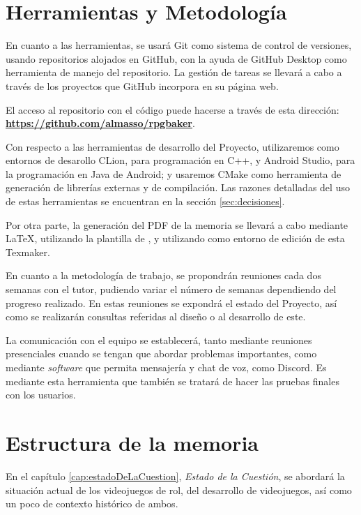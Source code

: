 \section{Herramientas y Metodología}
En cuanto a las herramientas, se usará Git como sistema de control de versiones, usando repositorios alojados en GitHub, con la ayuda de GitHub Desktop como herramienta de manejo del repositorio. La gestión de tareas se llevará a cabo a través de los proyectos que GitHub incorpora en su página web.

\smallskip

El acceso al repositorio con el código puede hacerse a través de esta dirección: \href{https://github.com/almasso/rpgbaker}{\textbf{https://github.com/almasso/rpgbaker}}.

\medskip

Con respecto a las herramientas de desarrollo del Proyecto, utilizaremos como entornos de desarollo CLion, para programación en C++, y Android Studio, para la programación en Java de Android; y usaremos CMake como herramienta de generación de librerías externas y de compilación. Las razones detalladas del uso de estas herramientas se encuentran en la sección \ref{sec:decisiones}.

\medskip

Por otra parte, la generación del PDF de la memoria se llevará a cabo mediante \LaTeX , utilizando la plantilla de \texis , y utilizando como entorno de edición de esta Texmaker.

\bigskip

En cuanto a la metodología de trabajo, se propondrán reuniones cada dos semanas con el tutor, pudiendo variar el número de semanas dependiendo del progreso realizado. En estas reuniones se expondrá el estado del Proyecto, así como se realizarán consultas referidas al diseño o al desarrollo de este.

\medskip

La comunicación con el equipo se establecerá, tanto mediante reuniones presenciales cuando se tengan que abordar problemas importantes, como mediante \textit{software} que permita mensajería y chat de voz, como Discord. Es mediante esta herramienta que también se tratará de hacer las pruebas finales con los usuarios.

\section{Estructura de la memoria} 
En el capítulo \ref{cap:estadoDeLaCuestion}, \textit{Estado de la Cuestión}, se abordará la situación actual de los videojuegos de rol, del desarrollo de videojuegos, así como un poco de contexto histórico de ambos.

